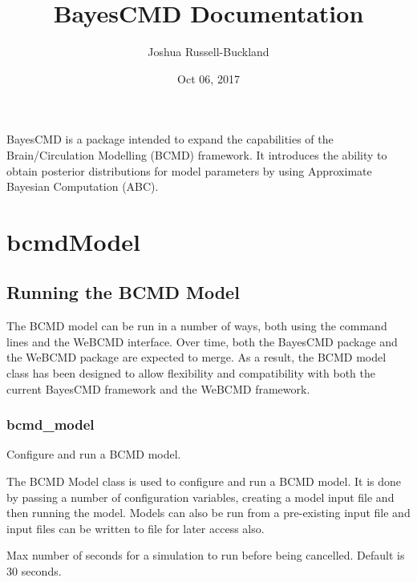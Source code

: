 \documentclass[letterpaper,10pt,english]{sphinxmanual}
\title{BayesCMD Documentation}
\date{Oct 06, 2017}
\author{Joshua Russell-Buckland}
\begin{document}
\maketitle
\sphinxtableofcontents
{}\label{\detokenize{index::doc}}


BayesCMD is a package intended to expand the capabilities of the
Brain/Circulation Modelling (BCMD) framework. It introduces the ability to
obtain posterior distributions for model parameters by using Approximate
Bayesian Computation (ABC).


\chapter{bcmdModel}
\label{\detokenize{bcmdModel:welcome-to-bayescmd-s-documentation}}\label{\detokenize{bcmdModel:bcmdmodel}}\label{\detokenize{bcmdModel::doc}}

\section{Running the BCMD Model}
\label{\detokenize{bcmdModel:running-the-bcmd-model}}
The BCMD model can be run in a number of ways, both using the command lines
and the WeBCMD interface. Over time, both the BayesCMD package and the WeBCMD
package are expected to merge. As a result, the BCMD model class has been
designed to allow flexibility and compatibility with both the current BayesCMD
framework and the WeBCMD framework.


\subsection{bcmd\_model}
\label{\detokenize{bcmdModel:module-bayescmd.bcmdModel.bcmd_model}}\label{\detokenize{bcmdModel:bcmd-model}}
Configure and run a BCMD model.

The BCMD Model class is used to configure and run a BCMD model. It is done by
passing a number of configuration variables, creating a model input file and
then running the model. Models can also be run from a pre-existing input file
and input files can be written to file for later access also.

\begin{fulllineitems}
\label{\detokenize{bcmdModel:bayescmd.bcmdModel.bcmd_model.TIMEOUT}}
 \textendash{} Max number of seconds for a simulation to run before being cancelled.
Default is 30 seconds.

\end{fulllineitems}
\end{document}
